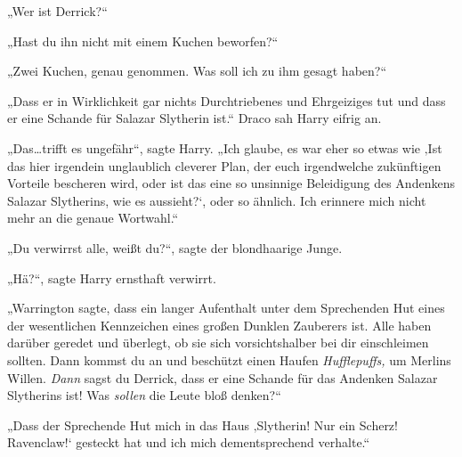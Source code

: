 „Wer ist Derrick?“

„Hast du ihn nicht mit einem Kuchen beworfen?“

„Zwei Kuchen, genau genommen. Was soll ich zu ihm gesagt haben?“

„Dass er in Wirklichkeit gar nichts Durchtriebenes und Ehrgeiziges tut und dass er eine Schande für Salazar Slytherin ist.“ Draco sah Harry eifrig an.

„Das…trifft es ungefähr“, sagte Harry. „Ich glaube, es war eher so etwas wie ‚Ist das hier irgendein unglaublich cleverer Plan, der euch irgendwelche zukünftigen Vorteile bescheren wird, oder ist das eine so unsinnige Beleidigung des Andenkens Salazar Slytherins, wie es aussieht?‘, oder so ähnlich. Ich erinnere mich nicht mehr an die genaue Wortwahl.“

„Du verwirrst alle, weißt du?“, sagte der blondhaarige Junge.

„Hä?“, sagte Harry ernsthaft verwirrt.

„Warrington sagte, dass ein langer Aufenthalt unter dem Sprechenden Hut eines der wesentlichen Kennzeichen eines großen Dunklen Zauberers ist. Alle haben darüber geredet und überlegt, ob sie sich vorsichtshalber bei dir einschleimen sollten. Dann kommst du an und beschützt einen Haufen \emph{Hufflepuffs,} um Merlins Willen. \emph{Dann} sagst du Derrick, dass er eine Schande für das Andenken Salazar Slytherins ist! Was \emph{sollen} die Leute bloß denken?“

„Dass der Sprechende Hut mich in das Haus ‚Slytherin! Nur ein Scherz! Ravenclaw!‘ gesteckt hat und ich mich dementsprechend verhalte.“

